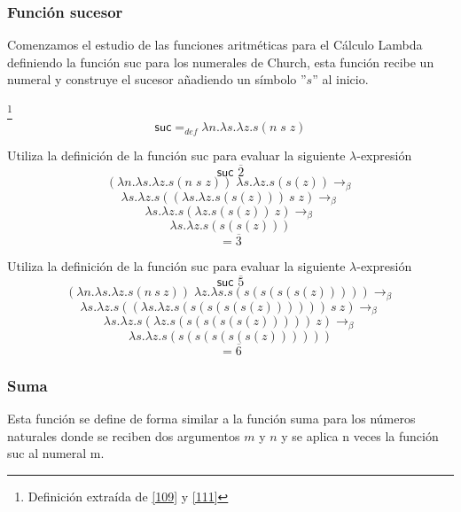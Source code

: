     \subsubsection{Función sucesor}
        Comenzamos el estudio de las funciones aritméticas para el Cálculo Lambda definiendo la función \textsf{suc} para los numerales de Church, esta función recibe un numeral y construye el sucesor añadiendo un símbolo ''$s$'' al inicio.
        \begin{definition}\footnote{Definición extraída de \hyperlink{109}{[109]} y  \hyperlink{111}{[111]}}
            $$\textsf{suc} =_{def} \lambda n.\lambda s.\lambda z. s(n \; s \; z)$$
        \end{definition}
     
        \begin{exercise}
            Utiliza la definición de la función \textsf{suc} para evaluar la siguiente  $\lambda$-expresión
            \[
                \textsf{suc } \overline{2}
            \]
            \[
                (\lambda n.\lambda s.\lambda z.s(n \; s \; z) ) \; \lambda s.\lambda z.s(s(z)) \rightarrow_\beta 
            \]
		\[
			\lambda s.\lambda z.s((\lambda s.\lambda z.s(s(z)))\ s \; z) \rightarrow_\beta 
		\]	
            \[
                 \lambda s.\lambda z.s(\lambda z.s(s(z))\ z) \rightarrow_\beta
            \]
		\[
			\lambda s.\lambda z.s(s(s(z)))
		\]
            \[
                = \overline{3}
            \]
        \end{exercise}

        \begin{exercise}
            Utiliza la definición de la función \textsf{suc} para evaluar la siguiente  $\lambda$-expresión
            \[
                \textsf{suc } \overline{5}
            \]
            \[
                (\lambda n.\lambda s.\lambda z.s(n\ s\ z)) \; \lambda z.\lambda s.s(s(s(s(s(z))))) \rightarrow_\beta
            \]
		\[
			 \lambda s.\lambda z.s((\lambda s.\lambda z.s(s(s(s(s(z))))))\ s\ z)  \rightarrow_\beta	
		\]
            \[
                \lambda s.\lambda z.s(\lambda z.s(s(s(s(s(z)))))\ z) \rightarrow_\beta 
            \]
		\[
			\lambda s.\lambda z.s(s(s(s(s(s(z))))))
		\]
            \[
                = \overline{6}
            \]
        \end{exercise}
        
    \subsubsection{Suma}
        Esta función se define de forma similar a la función suma para los números naturales  donde se reciben dos argumentos $m$ y $n$ y se aplica n veces la función \textsf{suc} al numeral m.

